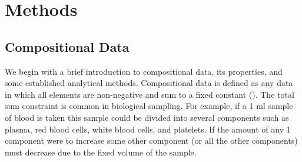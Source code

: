 \documentclass{article}\usepackage[]{graphicx}\usepackage[]{color}
\begin{document}



%

\section{Methods}
\subsection{Compositional Data}
We begin with a brief introduction to compositional data, its properties, and some established analytical methods.  Compositional data is defined as any data in which all elements are non-negative and sum to a fixed constant (\cite{Aitchison1986}). The total sum constraint is common in biological sampling.  For example, if a 1 ml sample of blood is taken this sample could be divided into several components such as plasma, red blood cells, white blood cells, and platelets.  If the amount of any 1 component were to increase some other component (or all the other components) must decrease due to the fixed volume of the sample.  \\

\end{document}

